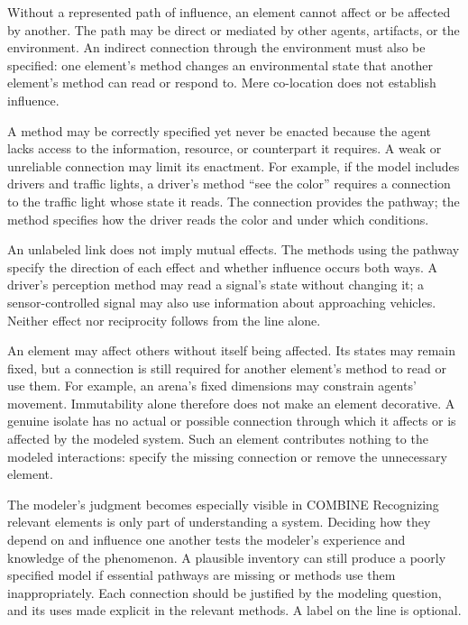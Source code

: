 \documentclass[11pt,a4paper]{article}
\begin{document}
\begin{description}[style=nextline,leftmargin=0pt,labelindent=0pt,labelsep=0pt,labelwidth=0pt,itemindent=0pt,itemsep=5pt]
\item[Provide a path for influence.] Without a represented path of influence, an element cannot affect or be affected by another. The path may be direct or mediated by other agents, artifacts, or the environment. An indirect connection through the environment must also be specified: one element's method changes an environmental state that another element's method can read or respond to. Mere co-location does not establish influence.

\item[Connect capabilities to their conditions of use.] A method may be correctly specified yet never be enacted because the agent lacks access to the information, resource, or counterpart it requires. A weak or unreliable connection may limit its enactment. For example, if the model includes drivers and traffic lights, a driver's method ``see the color'' requires a connection to the traffic light whose state it reads. The connection provides the pathway; the method specifies how the driver reads the color and under which conditions.

\item[Distinguish connectivity from the direction of effects.] An unlabeled link does not imply mutual effects. The methods using the pathway specify the direction of each effect and whether influence occurs both ways. A driver's perception method may read a signal's state without changing it; a sensor-controlled signal may also use information about approaching vehicles. Neither effect nor reciprocity follows from the line alone.

\item[Exclude genuine isolates.] An element may affect others without itself being affected. Its states may remain fixed, but a connection is still required for another element's method to read or use them. For example, an arena's fixed dimensions may constrain agents' movement. Immutability alone therefore does not make an element decorative. A genuine isolate has no actual or possible connection through which it affects or is affected by the modeled system. Such an element contributes nothing to the modeled interactions: specify the missing connection or remove the unnecessary element.
\end{description}

\begin{principle}{The modeler's judgment becomes especially visible in COMBINE}
Recognizing relevant elements is only part of understanding a system. Deciding how they depend on and influence one another tests the modeler's experience and knowledge of the phenomenon. A plausible inventory can still produce a poorly specified model if essential pathways are missing or methods use them inappropriately. Each connection should be justified by the modeling question, and its uses made explicit in the relevant methods. A label on the line is optional.
\end{principle}
\end{document}
